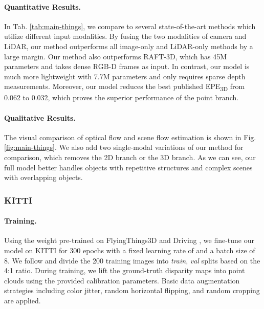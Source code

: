 \documentclass[10pt,twocolumn,letterpaper]{article}
\begin{document}
\vspace{-10pt}
\paragraph{Quantitative Results.} In Tab. \ref{tab:main-things}, we compare to several state-of-the-art methods which utilize different input modalities. By fusing the two modalities of camera and LiDAR, our method outperforms all image-only and LiDAR-only methods by a large margin. Our method also outperforms RAFT-3D, which has 45M parameters and takes dense RGB-D frames as input. In contrast, our model is much more lightweight with 7.7M parameters and only requires sparse depth measurements. Moreover, our model reduces the best published EPE\textsubscript{3D} from 0.062 to 0.032, which proves the superior performance of the point branch.

\vspace{-10pt}
\paragraph{Qualitative Results.} The visual comparison of optical flow and scene flow estimation is shown in Fig. \ref{fig:main-things}. We also add two single-modal variations of our method for comparison, which removes the 2D branch or the 3D branch. As we can see, our full model better handles objects with repetitive structures and complex scenes with overlapping objects.

\subsubsection{KITTI}

\paragraph{Training.} Using the weight pre-trained on FlyingThings3D and Driving \cite{mayer2016things3d}, we fine-tune our model on KITTI for 300 epochs with a fixed learning rate of  and a batch size of 8. We follow \cite{yang2021rigidmask, yang2020opticalexp} and divide the 200 training images into \textit{train}, \textit{val} splits based on the 4:1 ratio. During training, we lift the ground-truth disparity maps into point clouds using the provided calibration parameters. Basic data augmentation strategies including color jitter, random horizontal flipping, and random cropping are applied.

\vspace{-10pt}
\end{document}
